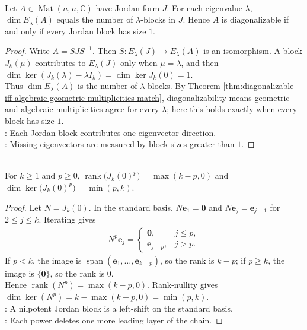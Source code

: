 \begin{corollary} \label{cor:jordan-blocks-diagonalizability} \\
Let $A\in\operatorname{Mat}(n,n,\mathbb{C})$ have Jordan form $J$. For each eigenvalue $\lambda$, $\dim E_{\lambda}(A)$ equals the number of $\lambda$-blocks in $J$. Hence $A$ is diagonalizable if and only if every Jordan block has size $1$.
\begin{proof}
Write $A=SJS^{-1}$. Then $S:E_{\lambda}(J)\to E_{\lambda}(A)$ is an isomorphism. A block $J_k(\mu)$ contributes to $E_{\lambda}(J)$ only when $\mu=\lambda$, and then $\dim\ker(J_k(\lambda)-\lambda I_k)=\dim\ker J_k(0)=1$.\\
Thus $\dim E_{\lambda}(A)$ is the number of $\lambda$-blocks. By Theorem \ref{thm:diagonalizable-iff-algebraic-geometric-multiplicities-match}, diagonalizability means geometric and algebraic multiplicities agree for every $\lambda$; here this holds exactly when every block has size $1$.\\
: Each Jordan block contributes one eigenvector direction.\\
: Missing eigenvectors are measured by block sizes greater than $1$.
\end{proof}
\end{corollary}

\begin{lemma} \label{lem:nilpotent-jordan-block-power-rank} \\
For $k\geq1$ and $p\geq0$, $\operatorname{rank}\bigl(J_k(0)^p\bigr)=\max(k-p,0)$ and $\dim\ker\bigl(J_k(0)^p\bigr)=\min(p,k)$.
\begin{proof}
Let $N=J_k(0)$. In the standard basis, $N\mathbf{e}_1=\mathbf{0}$ and $N\mathbf{e}_j=\mathbf{e}_{j-1}$ for $2\leq j\leq k$. Iterating gives
\begin{align}
N^p\mathbf{e}_j=
\begin{cases}
\mathbf{0}, & j\leq p,\\
\mathbf{e}_{j-p}, & j>p.
\end{cases} \nonumber
\end{align}
If $p<k$, the image is $\operatorname{span}(\mathbf{e}_1,\ldots,\mathbf{e}_{k-p})$, so the rank is $k-p$; if $p\geq k$, the image is $\{\mathbf{0}\}$, so the rank is $0$.\\
Hence $\operatorname{rank}(N^p)=\max(k-p,0)$. Rank-nullity gives $\dim\ker(N^p)=k-\max(k-p,0)=\min(p,k)$.\\
: A nilpotent Jordan block is a left-shift on the standard basis.\\
: Each power deletes one more leading layer of the chain.
\end{proof}
\end{lemma}

